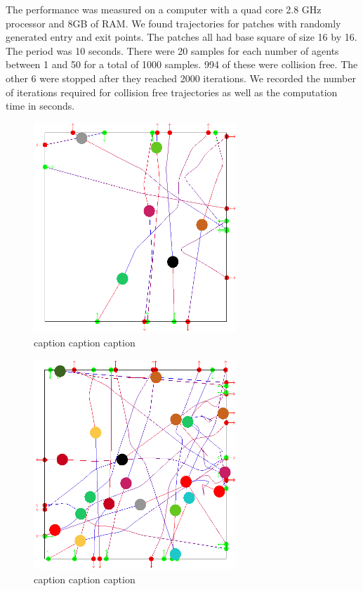 The performance was measured on a computer with a quad core 2.8 GHz processor and 8GB of RAM. We found trajectories for patches with randomly generated entry and exit points. The patches all had base square of size 16 by 16. The period was 10 seconds. There were 20 samples for each number of agents between 1 and 50 for a total of 1000 samples. 994 of these were collision free. The other 6 were stopped after they reached 2000 iterations. We recorded the number of iterations required for collision free trajectories as well as the computation time in seconds.

\begin{figure}[H]
 \centering
 \includegraphics[width=3in]{images/res-10-entry-exit.png}
 \caption{caption caption caption}
\end{figure}

\begin{figure}[H]
 \centering
 \includegraphics[width=3in]{images/res-20-entry-exit.png}
 \caption{caption caption caption}
\end{figure}

